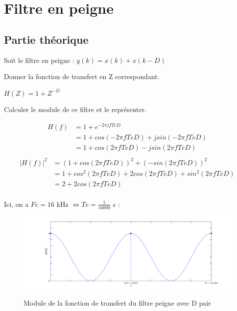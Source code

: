 
\section{Filtre en peigne}

\subsection{Partie théorique}

Soit le filtre en peigne : $y(k)= x(k)+ x(k − D)$

Donner la fonction de transfert en Z correspondant.

$H(Z) = 1 + Z^{-D}$

Calculer le module de ce filtre et le représenter.

\begin{align*}
  H(f) &= 1 + e^{-2\pi jfTeD}\\
       &= 1 + cos(-2\pi fTeD) + jsin(-2\pi fTeD)\\
       &= 1 + cos(2\pi fTeD) - jsin(2\pi fTeD)\\
\end{align*}
\begin{align*}
  |H(f)|^{2} &= (1 + cos(2\pi fTeD))^{2} + (-sin(2\pi fTeD))^{2}\\
             &= 1 + cos^{2}(2\pi fTeD) + 2cos(2\pi fTeD) + sin^{2}(2\pi fTeD)\\
             &= 2 + 2cos(2\pi fTeD)\\
\end{align*}


Ici, on a $Fe = 16$ kHz $\iff Te = \frac{1}{16000}$ s :

\begin{figure}[!ht]
		\begin{center}
			\includegraphics[width=1\textwidth]{img/modulePeigneDpairFull}
			\label{fig:modulePeigneDpair}
			\caption{Module de la fonction de transfert du filtre peigne avec D pair}
		\end{center}
\end{figure}

